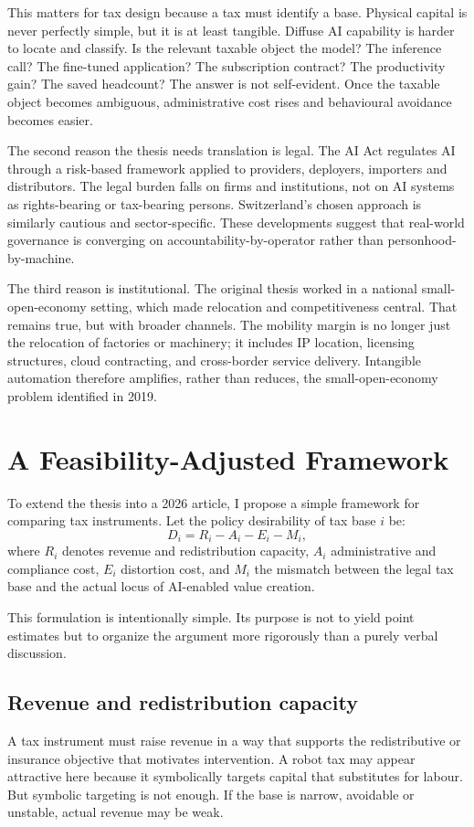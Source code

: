 \documentclass[11pt]{article}
\begin{document}
This matters for tax design because a tax must identify a base. Physical capital is never perfectly simple, but it is at least tangible. Diffuse AI capability is harder to locate and classify. Is the relevant taxable object the model? The inference call? The fine-tuned application? The subscription contract? The productivity gain? The saved headcount? The answer is not self-evident. Once the taxable object becomes ambiguous, administrative cost rises and behavioural avoidance becomes easier.

The second reason the thesis needs translation is legal. The AI Act regulates AI through a risk-based framework applied to providers, deployers, importers and distributors. The legal burden falls on firms and institutions, not on AI systems as rights-bearing or tax-bearing persons. Switzerland's chosen approach is similarly cautious and sector-specific. These developments suggest that real-world governance is converging on accountability-by-operator rather than personhood-by-machine.

The third reason is institutional. The original thesis worked in a national small-open-economy setting, which made relocation and competitiveness central. That remains true, but with broader channels. The mobility margin is no longer just the relocation of factories or machinery; it includes IP location, licensing structures, cloud contracting, and cross-border service delivery. Intangible automation therefore amplifies, rather than reduces, the small-open-economy problem identified in 2019.

\section{A Feasibility-Adjusted Framework}
To extend the thesis into a 2026 article, I propose a simple framework for comparing tax instruments. Let the policy desirability of tax base $i$ be:
\[
D_i = R_i - A_i - E_i - M_i,
\]
where $R_i$ denotes revenue and redistribution capacity, $A_i$ administrative and compliance cost, $E_i$ distortion cost, and $M_i$ the mismatch between the legal tax base and the actual locus of AI-enabled value creation.

This formulation is intentionally simple. Its purpose is not to yield point estimates but to organize the argument more rigorously than a purely verbal discussion.

\subsection{Revenue and redistribution capacity}
A tax instrument must raise revenue in a way that supports the redistributive or insurance objective that motivates intervention. A robot tax may appear attractive here because it symbolically targets capital that substitutes for labour. But symbolic targeting is not enough. If the base is narrow, avoidable or unstable, actual revenue may be weak.
\end{document}
